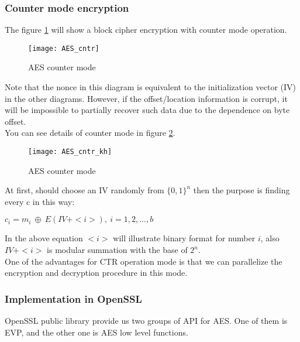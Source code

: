 \subsubsection{Counter mode encryption}
The figure \ref{fig:AES_CTR} will show a block cipher encryption with counter mode operation.


\begin{figure}[!h]
\centering\texttt{[image: AES\_cntr]}
\caption{AES counter mode}
\label{fig:AES_CTR} %
\end{figure}

Note that the nonce in this diagram is equivalent to the initialization vector (IV) in the other diagrams. However, if the offset/location information is corrupt, it will be impossible to partially recover such data due to the dependence on byte offset.
\\
\newline
You can see details of counter mode in figure \ref{fig:AES_cntr_kh}.

\begin{figure}[!h]
\centering\texttt{[image: AES\_cntr\_kh]}
\caption{AES counter mode}
\label{fig:AES_cntr_kh} %
\end{figure}

At first, should choose an IV randomly from $\{0,1\}^n$ then the purpose is finding every c in this way:
\begin{center}
$c_i = m_i\ \oplus\ E(IV + <i>),\ i = 1,2,...,b$	
\end{center}
In the above equation $<i>$ will illustrate binary format for number $i$, also $IV+<i>$ is modular summation with the base of $2^n$.
\\
One of the advantages for CTR operation mode is that we can parallelize the encryption and decryption procedure in this mode.
%
\subsubsection{Implementation in OpenSSL}

OpenSSL public library provide us two groups of API for AES. One of them is EVP, and the other one is AES low level functions. 

